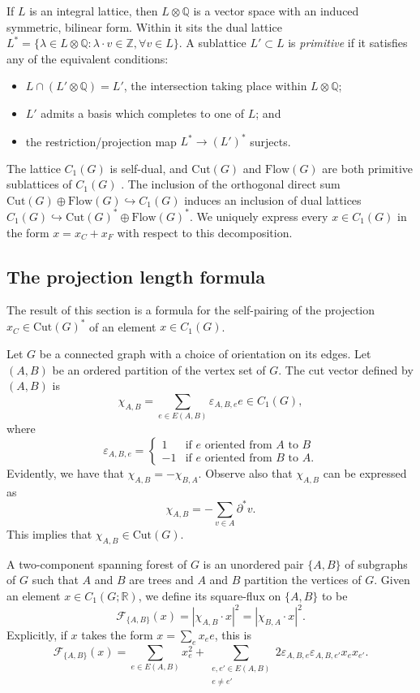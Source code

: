 \documentclass[11pt]{amsart}
\numberwithin{equation}{section}
\def\Cut{{\mathrm{Cut}}}
\def\Flow{{\mathrm{Flow}}}
\def\bQ{{\mathbb Q}}
\def\bR{{\mathbb R}}
\def\bZ{{\mathbb Z}}
\def\Cut{{\mathrm{Cut}}}
\def\Flow{{\mathrm{Flow}}}
\begin{document}
If $L$ is an integral lattice, then $L \otimes \mathbb{Q}$ is a vector space with an induced symmetric, bilinear form.
Within it sits the dual lattice $L^* = \{ \lambda \in L \otimes \mathbb{Q} : \lambda \cdot v \in \bZ, \forall v \in L \}$.
A sublattice $L' \subset L$ is {\em primitive} if it satisfies any of the equivalent conditions:
\begin{itemize}
    \item 
    $L \cap (L' \otimes \bQ) = L'$, the intersection taking place within $L \otimes \bQ$;
    \item
    $L'$ admits a basis which completes to one of $L$; and
    \item
    the restriction/projection map $L^* \to (L')^*$ surjects.
\end{itemize}
The lattice $C_1(G)$ is self-dual, and $\Cut(G)$ and $\Flow(G)$ are both primitive sublattices of $C_1(G)$ \cite[Proposition 3.1]{Greene2013}.
The inclusion of the orthogonal direct sum $\Cut(G) \oplus \Flow(G) \hookrightarrow C_1(G)$ induces an inclusion of dual lattices $C_1(G) \hookrightarrow \Cut(G)^* \oplus \Flow(G)^*$.
We uniquely express every $x \in C_1(G)$ in the form $x = x_C + x_F$ with respect to this decomposition.

\subsection{The projection length formula}

The result of this section is a formula for the self-pairing of the projection $x_C \in \Cut(G)^*$ of an element $x \in C_1(G)$.

Let $G$ be a connected graph with a choice of orientation on its edges.
Let $(A,B)$ be an ordered partition of the vertex set of $G$. The cut vector defined by $(A,B)$ is
\[
\chi_{A,B}=\sum_{e\in E(A,B)} \varepsilon_{A,B,e} e \in C_1(G),
\]
where 
\[
\varepsilon_{A,B,e}=\begin{cases} 1 &\text{if $e$ oriented from $A$ to $B$}\\
 -1 &\text{if $e$ oriented from $B$ to $A$}.
\end{cases}
\]
Evidently, we have that $\chi_{A,B}=-\chi_{B,A}$. Observe also that $\chi_{A,B}$ can be expressed as
\begin{equation}\label{eq:chi_formula}
    \chi_{A,B}=-\sum_{v\in A} \partial^* v.
\end{equation}
This implies that $\chi_{A,B}\in \Cut(G)$.

A two-component spanning forest of $G$ is an unordered pair $\{A,B\}$ of subgraphs of $G$ such that $A$ and $B$ are trees and $A$ and $B$ partition the vertices of $G$.
 Given an element $x\in C_1(G;\bR)$, we define its square-flux on $\{A,B\}$ to be 
\[\mathcal{F}_{\{A,B\}}(x)=|\chi_{A,B}\cdot x|^2 = |\chi_{B,A}\cdot x|^2.\]
Explicitly, if $x$ takes the form $x=\sum_e x_e e$, this is
\begin{equation}\label{eq:flux_formula}
\mathcal{F}_{\{A,B\}}(x)=\sum_{e\in E(A,B)} x_e^2 + \sum_{\substack{e,e'\in E(A,B)\\ e\neq e'}} 2\varepsilon_{A,B,e}\varepsilon_{A,B,e'} x_e x_{e'}.
\end{equation}
\end{document}

